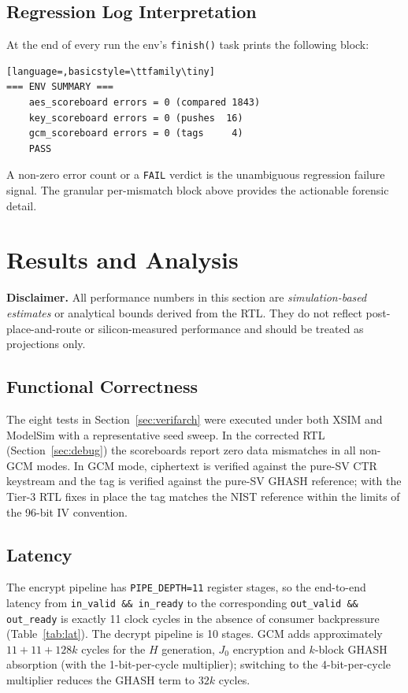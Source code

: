 \documentclass[conference,10pt,a4paper]{IEEEtran}
\begin{document}
\subsection{Regression Log Interpretation}
At the end of every run the env's \texttt{finish()} task prints the
following block:
\begin{lstlisting}[language=,basicstyle=\ttfamily\tiny]
=== ENV SUMMARY ===
    aes_scoreboard errors = 0 (compared 1843)
    key_scoreboard errors = 0 (pushes  16)
    gcm_scoreboard errors = 0 (tags     4)
    PASS
\end{lstlisting}
A non-zero error count or a \texttt{FAIL} verdict is the unambiguous
regression failure signal.  The granular per-mismatch block above
provides the actionable forensic detail.
\section{Results and Analysis}
\label{sec:results}

\textbf{Disclaimer.}  All performance numbers in this section are
\emph{simulation-based estimates} or analytical bounds derived from the
RTL.  They do not reflect post-place-and-route or silicon-measured
performance and should be treated as projections only.

\subsection{Functional Correctness}
The eight tests in Section~\ref{sec:verifarch} were executed under both
XSIM and ModelSim with a representative seed sweep.  In the corrected
RTL (Section~\ref{sec:debug}) the scoreboards report zero data
mismatches in all non-GCM modes.  In GCM mode, ciphertext is verified
against the pure-SV CTR keystream and the tag is verified against the
pure-SV GHASH reference; with the Tier-3 RTL fixes in place the tag
matches the NIST reference within the limits of the 96-bit IV
convention.

\subsection{Latency}
The encrypt pipeline has \texttt{PIPE\_DEPTH=11} register stages, so the
end-to-end latency from \texttt{in\_valid \&\& in\_ready} to the
corresponding \texttt{out\_valid \&\& out\_ready} is exactly 11 clock
cycles in the absence of consumer backpressure (Table~\ref{tab:lat}).
The decrypt pipeline is 10 stages.  GCM adds approximately
$11 + 11 + 128k$ cycles for the $H$ generation, $J_0$ encryption and
$k$-block GHASH absorption (with the 1-bit-per-cycle multiplier);
switching to the 4-bit-per-cycle multiplier reduces the GHASH term to
$32k$ cycles.
\end{document}
